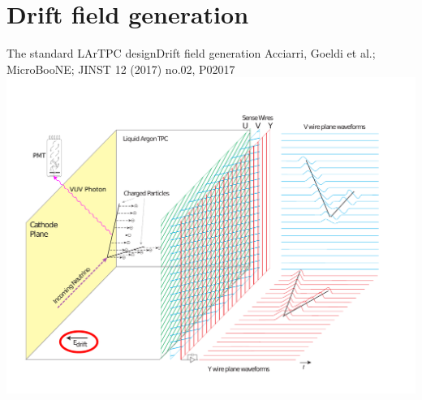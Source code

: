 \documentclass[]{beamer}
\newcommand*{\uboone}{{MicroBooNE}}
\newcommand*{\lartpc}{{LArTPC}}
\begin{document}
\section{Drift field generation}

\begin{frame}{The standard \lartpc{} design}{Drift field generation}
	{\tiny Acciarri, Goeldi et al.; \uboone{}; JINST 12 (2017) no.02, P02017~\cite{uboone}}\\
	\centering
	\includegraphics[viewport=35 40 720 540, clip, height=.75\textheight]{defence/TPCprinciple_HV}\\
\end{frame}
\end{document}
